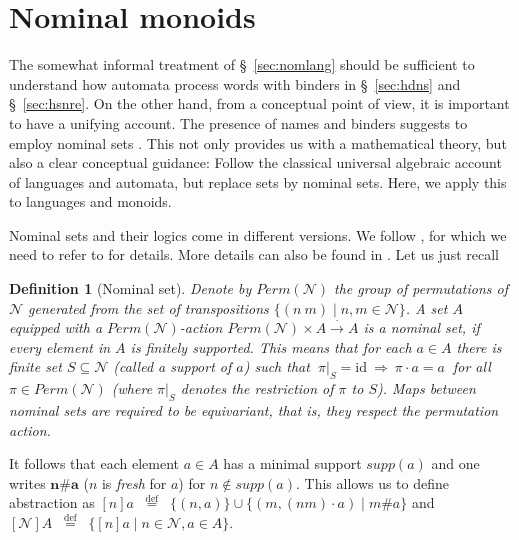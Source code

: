 \documentclass[runningheads,a4paper]{llncs}
\newcommand{\id}[1]{\mathrm{id}_{#1}}
\newcommand{\mmdef}{\mbox{$\;\;\stackrel{\mathrm{def}}{=}\;\;$}}
\newcommand{\supp}{\mathit{supp}}
\newcommand{\names}{\mbox{$\mathcal{N}$}}
\newtheorem{definition}{Theorem}[section]
\newtheorem{definition}{Definition}[section]
\begin{document}
\section{Nominal monoids}\label{sec:nom-monoid}

The somewhat informal treatment of \S~\ref{sec:nomlang} should be
sufficient to understand how automata process words with binders in
\S~\ref{sec:hdns} and \S~\ref{sec:hsnre}. On the other hand, from a
conceptual point of view, it is important to have a unifying
account. The presence of names and binders suggests to employ nominal
sets \cite{gp02}. This not only provides us with a mathematical
theory, but also a clear conceptual guidance: Follow the classical
universal algebraic account of languages and automata, but replace
sets by nominal sets. Here, we apply this to languages and monoids.

Nominal sets and their logics come in different versions. We follow
\cite{gabb-math:nom-alg}, for which we need to refer to for
details. More details can also be found in \cite{kst10}. Let us just
recall

\begin{definition}[Nominal set]
  Denote by $\mathit{Perm}(\names)$ the group of permutations of
  $\names$ generated from the set of transpositions $\{(n\ m)\mid
  n,m\in\names\}$. A set $A$ equipped with a
  $\mathit{Perm}(\names)$-action $\mathit{Perm}(\names)\times
  A\stackrel{\cdot}{\longrightarrow} A$ is a \emph{nominal set}, if
  every element in $A$ is finitely supported. This means that for each
  $a\in A$ there is finite set $S\subseteq\names$ (called a support of
  $a$) such that $\ \pi|_S=\id \ \Rightarrow \ \pi\cdot a = a\ $ for all
  $\pi\in\mathit{Perm}(\names)$ (where $\pi|_S$ denotes the
  restriction of $\pi$ to $S$). Maps between nominal sets are required
  to be equivariant, that is, they respect the permutation action.
\end{definition}
It follows 
that each element $a\in A$ has a minimal support $\supp(a)$ and one
writes $\mathbf{n\#a}$ ($n$ is \emph{fresh} for $a$) for
$n\notin\supp(a)$. This allows us to define abstraction \cite[Lemma
5.1]{gp02} as $[n]a\mmdef\{(n,a)\}\cup\{(m,(nm)\cdot a) \mid m\#a\}$
and 
$[\names]A\mmdef\{[n]a\mid n\in\names, a\in A\}$.
\end{document}
